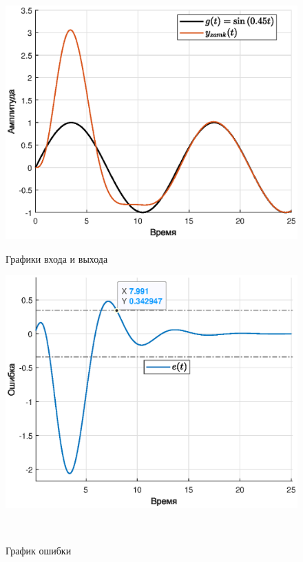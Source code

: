\documentclass[a4paper]{article}
\begin{document}
\begin{figure}[H]
    \begin{minipage}{0.5\textwidth}
        \centering \includegraphics[width=\textwidth]{ex6/sin.eps}
        \caption{Графики входа и выхода}
    \end{minipage}\hfill
    \begin{minipage}{0.5\textwidth}
        \centering \includegraphics[width=\textwidth]{ex6/error_0.135.eps}
        \caption{График ошибки}
    \end{minipage}\\[1em]
\end{figure}\noindent\
\end{document}
